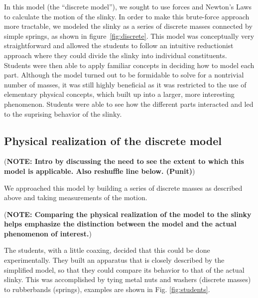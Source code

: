 \documentclass[prb,preprint,superscriptaddress]{revtex4-1}
\newcommand{\NOTE}[1]{\marginpar{\footnotesize\textbf{NOTE}} (\textbf{NOTE: #1})}
\newcommand{\subsec}[1]{section~\ref{subsec:#1}}
\newcommand{\fig}[1]{figure~\ref{fig:#1}}
\begin{document}
In this model (the ``discrete model''), we sought to use forces and Newton's Laws to calculate the
motion of the slinky. In order to make this brute-force approach more tractable, we
modeled the slinky as a series of discrete masses connected by simple springs, as
shown in \fig{discrete}. This
model was conceptually very straightforward and allowed the students to follow an
intuitive reductionist approach where they could divide the slinky into individual
constituents. Students were then able to apply familiar concepts in deciding how to model each part. Although the model turned out to
be formidable to solve for a nontrivial number of masses, it was still highly beneficial as it was restricted to the
use of elementary physical concepts, which built up into a larger, more interesting
phenomenon. Students were able to see how the different parts interacted and led
to the suprising behavior of the slinky.



\subsection{Physical realization of the discrete model}
\label{subsec:forcesexperiment}

\NOTE{Intro by discussing the need to see the extent to which this model
is applicable. Also reshuffle line below. (Punit)}

We approached this model
by building a series of discrete masses as described above and taking measurements of
the motion.

\NOTE{Comparing the physical realization of the model to the slinky 
helps emphasize the distinction between the model and the actual phenomenon of interest.}


The students, with a little coaxing, decided that this could be done experimentally.  They built an 
apparatus that is closely described by the simplified model, so that they could compare its behavior to that of the 
actual slinky.  This was accomplished by tying metal nuts and washers (discrete masses) to 
rubberbands (springs), examples are shown in Fig. \ref{fig:students}.  
\end{document}
